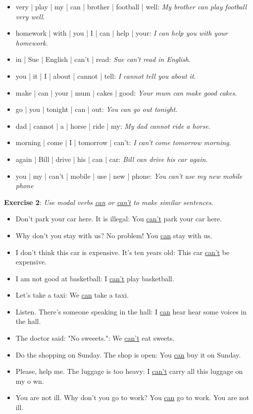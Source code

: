 \begin{itemize}

\item very | play | my | can | brother | football | well: \textit{My brother can play football very well}.
\item homework | with | you | I | can | help | your: \textit{I can help you with your homework}.
\item in | Sue | English | can't | read: \textit{Sue can't read in English}.
\item you | it | I | about | cannot | tell: \textit{I cannot tell you about it}.
\item make | can | your | mum | cakes | good: \textit{Your mum can make good cakes}.
\item go | you | tonight | can | out: \textit{You can go out tonight}.
\item dad | cannot | a | horse | ride | my: \textit{My dad cannot ride a horse}.
\item morning | come | I | tomorrow | can't: \textit{I can't come tomorrow morning}.
\item again | Bill | drive | his | can | car: \textit{Bill can drive his car again}.
\item you | my | can't | mobile | use | new | phone: \textit{You can't use my new mobile phone}

\end{itemize}

\textbf{Exercise 2}: \textit{Use modal verbs \underline{can} or \underline{can't} to make similar sentences}.

\begin{itemize}

\item Don't park your car here. It is illegal: You \underline{can't} park your car here.
\item Why don't you stay with us? No problem! You \underline{can} stay with us.
\item I don't think this car is expensive. It's ten years old: This car \underline{can't} be expensive.
\item I am not good at basketball: I \underline{can't} play basketball.
\item Let's take a taxi: We \underline{can} take a taxi.
\item Listen. There's someone speaking in the hall: I \underline{can} hear hear some voices in the hall.
\item The doctor said: "No sweeets.": We \underline{can't} eat sweets.
\item Do the shopping on Sunday. The shop is open: You \underline{can} buy it on Sunday.
\item Please, help me. The luggage is too heavy: I \underline{can't} carry all this luggage on my o
wn. 
\item You are not ill. Why don't you go to work? You \underline{can} go to work. You are not ill.

\end{itemize}

